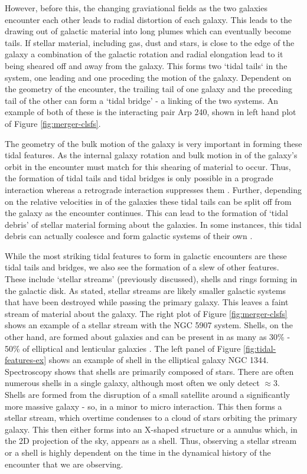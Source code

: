 However, before this, the changing graviational fields as the two galaxies encounter each other leads to radial distortion of each galaxy. This leads to the drawing out of galactic material into long plumes which can eventually become tails. If stellar material, including gas, dust and stars, is close to the edge of the galaxy a combination of the galactic rotation and radial elongation lead to it being sheared off and away from the galaxy. This forms two `tidal tails` in the system, one leading and one proceding the motion of the galaxy. Dependent on the geometry of the encounter, the trailing tail of one galaxy and the preceding tail of the other can form a `tidal bridge' - a linking of the two systems. An example of both of these is the interacting pair Arp 240, shown in left hand plot of Figure \ref{fig:merger-clsfs}. 

The geometry of the bulk motion of the galaxy is very important in forming these tidal features. As the internal galaxy rotation and bulk motion in of the galaxy's orbit in the encounter must match for this shearing of material to occur. Thus, the formation of tidal tails and tidal bridges is only possible in a prograde interaction whereas a retrograde interaction suppresses them \citep{Papers on prograde and retrograde interactions}. Further, depending on the relative velocities in of the galaxies these tidal tails can be split off from the galaxy as the encounter continues. This can lead to the formation of `tidal debris' of stellar material forming about the galaxies. In some instances, this tidal debris can actually coalesce and form galactic systems of their own \citep{Papers on tidal dwarfs and need to actually proof this is a thing}.

While the most striking tidal features to form in galactic encounters are these tidal tails and bridges, we also see the formation of a slew of other features. These include `stellar streams' (previously discussed), shells and rings forming in the galactic disk. As stated, stellar streams are likely smaller galactic systems that have been destroyed while passing the primary galaxy. This leaves a faint stream of material about the galaxy. The right plot of Figure \ref{fig:merger-clsfs} shows an example of a stellar stream with the NGC 5907 system. Shells, on the other hand, are formed about galaxies and can be present in as many as 30\% - 50\% of elliptical and lenticular galaxies \citep{Shell presense in galaxies}. The left panel of Figure \ref{fig:tidal-features-ex} shows an example of shell in the elliptical galaxy NGC 1344. Spectroscopy shows that shells are primarily composed of stars. There are often numerous shells in a single galaxy, although most often we only detect $\approx$3. Shells are formed from the disruption of a small satellite around a significantly more massive galaxy - so, in a minor to micro interaction. This then forms a stellar stream, which overtime condenses to a cloud of stars orbiting the primary galaxy. This then either forms into an X-shaped structure or a annulus which, in the 2D projection of the sky, appears as a shell. Thus, observing a stellar stream or a shell is highly dependent on the time in the dynamical history of the encounter that we are observing.


